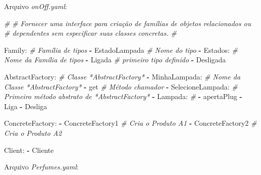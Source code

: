 \documentclass[]{article}
\newenvironment{Shaded}{}{}
\newcommand{\KeywordTok}[1]{\textcolor[rgb]{0.00,0.44,0.13}{\textbf{{#1}}}}
\newcommand{\CommentTok}[1]{\textcolor[rgb]{0.38,0.63,0.69}{\textit{{#1}}}}
\newcommand{\FunctionTok}[1]{\textcolor[rgb]{0.02,0.16,0.49}{{#1}}}
\newcommand{\NormalTok}[1]{{#1}}
\begin{document}
\clearpage
Arquivo \emph{onOff.yaml}:

\begin{Shaded}
\begin{Highlighting}[]
\CommentTok{#}
\CommentTok{# Fornecer uma interface para criação de famílias de objetos relacionados ou}
\CommentTok{# dependentes sem especificar suas classes concretas.}
\CommentTok{#}

\FunctionTok{Family:}                     \CommentTok{# Família de tipos}
\KeywordTok{-} \NormalTok{EstadoLampada             }\CommentTok{# Nome do tipo}
\KeywordTok{-} \FunctionTok{Estados:}                  \CommentTok{# Nome da Família de tipos}
    \KeywordTok{-} \NormalTok{Ligada                }\CommentTok{# primeiro tipo definido}
    \KeywordTok{-} \NormalTok{Desligada}

\FunctionTok{AbstractFactory:}            \CommentTok{# Classe *AbstractFactory*}
\KeywordTok{-} \FunctionTok{MinhaLampada:}             \CommentTok{# Nome da Classe *AbstractFactory*}
    \KeywordTok{-} \NormalTok{get                   }\CommentTok{# Método chamador}
    \KeywordTok{-} \FunctionTok{SelecioneLampada:}     \CommentTok{# Primeiro método abstrato de *AbstractFactory*}
        \KeywordTok{-} \FunctionTok{Lampada:}          \CommentTok{# }
            \KeywordTok{-} \NormalTok{apertaPlug}
            \KeywordTok{-} \NormalTok{Liga}
            \KeywordTok{-} \NormalTok{Desliga}

\FunctionTok{ConcreteFactory:}
\KeywordTok{-} \NormalTok{ConcreteFactory1          }\CommentTok{# Cria o Produto A1}
\KeywordTok{-} \NormalTok{ConcreteFactory2          }\CommentTok{# Cria o Produto A2}

\FunctionTok{Client:}
\KeywordTok{-} \NormalTok{Cliente}
\end{Highlighting}
\end{Shaded}

\clearpage
Arquivo \emph{Perfumes.yaml}:
\end{document}
